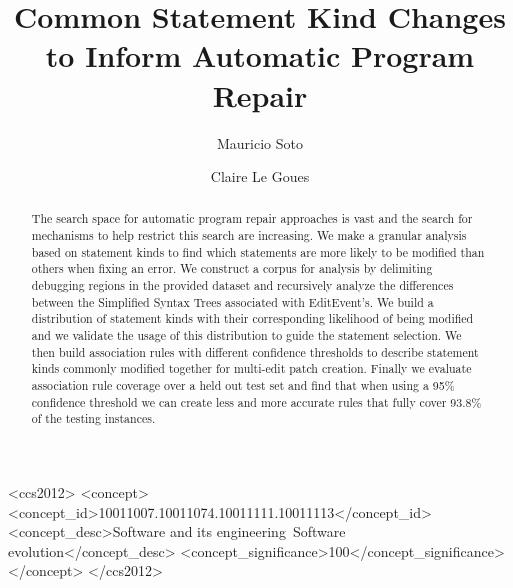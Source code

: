 \documentclass[sigconf]{acmart}
\begin{document}
\title{Common Statement Kind Changes to Inform Automatic Program Repair}


\author{Mauricio Soto}

\author{Claire Le Goues}





\begin{abstract}
The search space for automatic program repair approaches 
is vast and the search for mechanisms to help restrict this 
search are increasing.
We make a granular analysis based on statement kinds
to find which statements are more likely to be modified than others
when fixing an error.
We construct a corpus for analysis by 
delimiting debugging regions in the provided dataset and 
recursively analyze the
differences between the Simplified Syntax Trees associated with EditEvent's. 
We build a distribution of statement kinds with their corresponding
likelihood of being modified and we validate the usage of this 
distribution to guide the statement selection.
We then build association rules with different
confidence thresholds to describe statement kinds commonly modified
together for multi-edit patch creation. Finally
we evaluate association rule coverage over a held out test set
and find that when using a 95\% confidence threshold we
can create less and more accurate rules that fully cover 93.8\% of the testing instances.

\end{abstract}

%
%
\begin{CCSXML}
<ccs2012>
<concept>
<concept_id>10011007.10011074.10011111.10011113</concept_id>
<concept_desc>Software and its engineering~Software evolution</concept_desc>
<concept_significance>100</concept_significance>
</concept>
</ccs2012>
\end{CCSXML}
\end{document}
